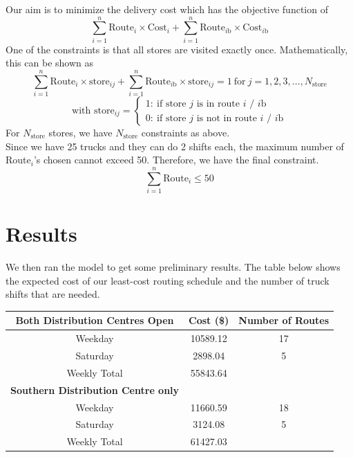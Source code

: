 \documentclass[11pt, a4paper]{article}   	%
\begin{document}
	\noindent 
	Our aim is to minimize the delivery cost which has the objective function of
	\[
	\sum_{i=1}^{n} \text{Route}_{i}\times \text{Cost}_{i} +\sum_{i=1}^{n} \text{Route}_{i\text{b}}\times \text{Cost}_{i\text{b}}
	\] 
	One of the constraints is that all stores are visited exactly once. Mathematically, this can be shown as
	\[
	\sum_{i=1}^{n} \text{Route}_{i}\times \text{store}_{ij}+\sum_{i=1}^{n} \text{Route}_{i\text{b}}\times \text{store}_{ij}=1 \ \text{for} \ j=1,2,3,\dots,N_\text{store}  
	\]
	\[
	\text{with store}_{ij}=\begin{cases} 
	1: \ \text{if store $j$ is in route $i$ / $i$b}\\
	0: \ \text{if store $j$ is not in route $i$  / $i$b} 
	\end{cases}
	\]
	For $N_{\text{store}}$ stores, we have $N_{\text{store}}$ constraints as above. \\
	\newpage
	\noindent  Since we have 25 trucks and they can do 2 shifts each, the maximum number of Route$_i$'s chosen cannot exceed 50. Therefore, we have the final constraint.
	\[
	\sum_{i=1}^{n} \text{Route}_i \leq 50
	\]
	
	
\section{Results}
We then ran the model to get some preliminary results. The table below shows the expected cost of our least-cost routing schedule and the number of truck shifts that are needed.

	\begin{center}
	\begin{tabular}{|c|c|c|}
		\hline
		\textbf{Both Distribution Centres Open} & \textbf{Cost} (\$) & \textbf{Number of Routes} \\
		\hline
		Weekday & 10589.12 & 17 \\
		\hline
		Saturday & 2898.04 & 5 \\
		\hline
		Weekly Total & 55843.64 &  \\
		\hline
		\textbf{Southern Distribution Centre only} &  &  \\
		\hline
		Weekday & 11660.59 & 18 \\
		\hline
		Saturday & 3124.08 & 5 \\
		\hline
		Weekly Total & 61427.03 &  \\
		\hline
	\end{tabular}
	\end{center}
\end{document}
